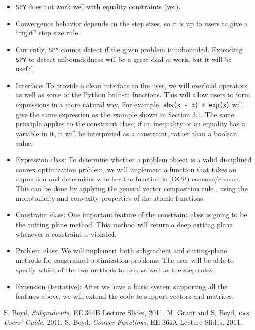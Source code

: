 \documentclass[12pt]{article}
\begin{document}
\begin{itemize}
\item \verb'SPY' does not work well with equality constraints (yet).
\item Convergence behavior depends on the step sizes, so it is up to users to give a ``right'' step size rule.
\item Currently, \verb'SPY' cannot detect if the given problem is unbounded. Extending \verb'SPY' to detect unboundedness will be a great deal of work, but it will be useful.

\item Interface: To provide a clean interface to the user, we will overload operators as well as some of the Python built-in functions. This will allow users to form expressions in a more natural way. For example, \verb'abs(x - 3) + exp(x)' will give the same expression as the example shown in Section 3.1. The same principle applies to the constraint class; if an inequality or an equality has a variable in it, it will be interpreted as a constraint, rather than a boolean value.
\item Expression class: To determine whether a problem object is a valid disciplined convex optimization problem, we will implement a function that takes an expression and determines whether the function is (DCP) concave/convex. This can be done by applying the general vector composition rule \cite{cvx}, using the monotonicity and convexity properties of the atomic functions.
\item Constraint class: One important feature of the constraint class is going to be the cutting plane method. This method will return a deep cutting plane whenever a constraint is violated.
\item Problem class: We will implement both subgradient and cutting-plane methods for constrained optimization problems. The user will be able to specify which of the two methods to use, as well as the step rules.
\item Extension (tentative): After we have a basic system supporting all the features above, we will extend the code to support vectors and matrices.
\end{itemize}

\begin{thebibliography}{99}
 S. Boyd, \emph{Subgradients}, EE 364B Lecture Slides, 2011.
 M. Grant and S. Boyd, \verb'cvx' \emph{Users' Guide}, 2011.
 S. Boyd, \emph{Convex Functions}, EE 364A Lecture Slides, 2011.
\end{thebibliography}
\end{document}
